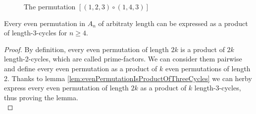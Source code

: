 \begin{figure}[H]
\label{fig:SwapTwoAs3Cycles}
    \centering
    \caption{The permutation $[(1,2,3) \circ (1,4,3)]$ }

\end{figure} \vspace{0.4em}

\begin{lemma}
    \label{lem:evenPermutationIsProductOfThreeCycles}
    Every even permutation in $A_n$ of arbitraty length can be expressed 
    as a product of length-3-cycles for $n \geq 4$.
\end{lemma}
\begin{proof}
    By definition, every even permutation of length $2k$ is a product of $2k$ length-2-cycles, which 
    are called prime-factors. We can consider them pairwise and define every even permutation 
    as a product of $k$ even permutations of length 2. Thanks to lemma 
    \ref{lem:evenPermutationIsProductOfThreeCycles} we can herby
    express every even permutation of length $2k$ as a product of $k$ length-3-cycles,
    thus proving the lemma. \\
\end{proof} \vspace{0.2em}

